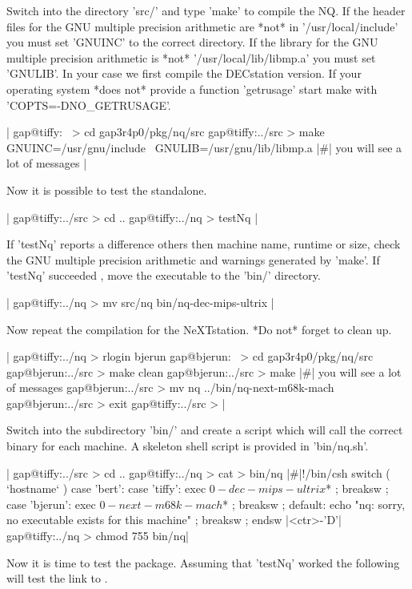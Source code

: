 Switch into the directory 'src/' and type  'make' to compile  the NQ.  If
the header files for  the GNU multiple  precision arithmetic are *not* in
'/usr/local/include' you must set 'GNUINC' to  the correct directory.  If
the    library  for the   GNU  multiple  precision   arithmetic  is *not*
'/usr/local/lib/libmp.a'  you must set 'GNULIB'.   In  your case we first
compile  the  DECstation version. If  your  operating  system  *does not*
provide a function 'getrusage' start make with 'COPTS=-DNO\_GETRUSAGE'.

|    gap@tiffy:~ > cd gap3r4p0/pkg/nq/src
    gap@tiffy:../src > make GNUINC=/usr/gnu/include \
                            GNULIB=/usr/gnu/lib/libmp.a
    |\#| you will see a lot of messages |

Now it is possible to test the standalone.

|    gap@tiffy:../src > cd ..
    gap@tiffy:../nq > testNq |

If  'testNq' reports a  difference others then  machine name,  runtime or
size, check the GNU multiple precision  arithmetic and warnings generated
by  'make'.   If  'testNq'  succeeded  ,   move  the  executable  to  the
'bin/' directory.

|    gap@tiffy:../nq > mv src/nq bin/nq-dec-mips-ultrix |

Now repeat the compilation  for the NeXTstation. *Do not* forget to clean
up.

|    gap@tiffy:../nq > rlogin bjerun
    gap@bjerun:~ > cd gap3r4p0/pkg/nq/src
    gap@bjerun:../src > make clean
    gap@bjerun:../src > make
    |\#| you will see a lot of messages
    gap@bjerun:../src > mv nq ../bin/nq-next-m68k-mach
    gap@bjerun:../src > exit
    gap@tiffy:../src > |

Switch into the  subdirectory 'bin/' and  create a script which will call
the correct binary for each machine.  A skeleton shell script is provided
in 'bin/nq.sh'.

|    gap@tiffy:../src > cd ..
    gap@tiffy:../nq > cat > bin/nq
    |\#|!/bin/csh
    switch ( `hostname` )
      case 'bert':
      case 'tiffy':
        exec $0-dec-mips-ultrix $* ;
        breaksw ;
      case 'bjerun':
        exec $0-next-m68k-mach $* ;
        breaksw ;
      default:
        echo "nq: sorry, no executable exists for this machine" ;
        breaksw ;
    endsw
    |<ctr>-'D'|
    gap@tiffy:../nq > chmod 755 bin/nq|

Now it is time  to test the  package.  Assuming that  'testNq' worked the
following will test the link to {\GAP}.

